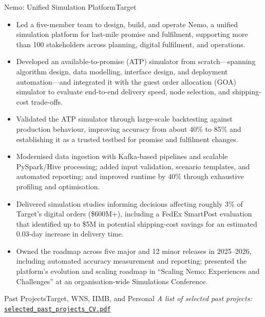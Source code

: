 \documentclass[11pt,a4paper]{moderncv}
\begin{document}
    {Nemo: Unified Simulation Platform}{Target}{}{}{
    \begin{itemize}
        \item Led a five-member team to design, build, and operate Nemo, a unified simulation platform for last-mile promise and fulfilment, supporting more than 100 stakeholders across planning, digital fulfilment, and operations.
        \item Developed an available-to-promise (ATP) simulator from scratch---spanning algorithm design, data modelling, interface design, and deployment automation---and integrated it with the guest order allocation (GOA) simulator to evaluate end-to-end delivery speed, node selection, and shipping-cost trade-offs.
        \item Validated the ATP simulator through large-scale backtesting against production behaviour, improving accuracy from about 40\% to 85\% and establishing it as a trusted testbed for promise and fulfilment changes.
        \item Modernised data ingestion with Kafka-based pipelines and scalable PySpark/Hive processing; added input validation, scenario templates, and automated reporting; and improved runtime by 40\% through exhaustive profiling and optimisation.
        \item Delivered simulation studies informing decisions affecting roughly 3\% of Target's digital orders (\$600M+), including a FedEx SmartPost evaluation that identified up to \$5M in potential shipping-cost savings for an estimated 0.03-day increase in delivery time.
        \item Owned the roadmap across five major and 12 minor releases in 2025--2026, including automated accuracy measurement and reporting; presented the platform's evolution and scaling roadmap in ``Scaling Nemo: Experiences and Challenges'' at an organisation-wide Simulations Conference.
    \end{itemize}
    }

    {Past Projects}{Target, WNS, IIMB, and Personal}{}{}{
    \noindent \textit{A list of selected past projects:}
    \href{https://github.com/nik141088/CV/blob/main/selected_past_projects_CV.pdf}{\texttt{selected\_past\_projects\_CV.pdf}}
    }

\end{document}
